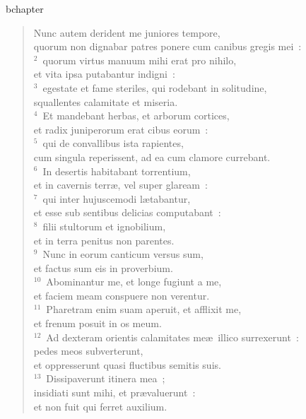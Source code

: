 bchapter\begin{flushleft}\begin{verse}\vspace{-19pt}\hspace{6pt}Nunc autem derident me juniores tempore,\\\hspace{6pt} quorum non dignabar patres ponere cum canibus gregis mei~:\\
${}^{2}$~quorum virtus manuum mihi erat pro nihilo,\\ et vita ipsa putabantur indigni~:\\
${}^{3}$~egestate et fame steriles, qui rodebant in solitudine,\\ squallentes calamitate et miseria.\\
${}^{4}$~Et mandebant herbas, et arborum cortices,\\ et radix juniperorum erat cibus eorum~:\\
${}^{5}$~qui de convallibus ista rapientes,\\ cum singula reperissent, ad ea cum clamore currebant.\\
${}^{6}$~In desertis habitabant torrentium,\\ et in cavernis terr\ae , vel super glaream~:\\
${}^{7}$~qui inter hujuscemodi l\ae tabantur,\\ et esse sub sentibus delicias computabant~:\\
${}^{8}$~filii stultorum et ignobilium,\\ et in terra penitus non parentes.\\
${}^{9}$~Nunc in eorum canticum versus sum,\\ et factus sum eis in proverbium.\\
${}^{10}$~Abominantur me, et longe fugiunt a me,\\ et faciem meam conspuere non verentur.\\
${}^{11}$~Pharetram enim suam aperuit, et afflixit me,\\ et frenum posuit in os meum.\\
${}^{12}$~Ad dexteram orientis calamitates me\ae\ illico surrexerunt~:\\ pedes meos subverterunt,\\ et oppresserunt quasi fluctibus semitis suis.\\
${}^{13}$~Dissipaverunt itinera mea~;\\ insidiati sunt mihi, et pr\ae valuerunt~:\\ et non fuit qui ferret auxilium.\\

\end{verse}
\end{flushleft}
